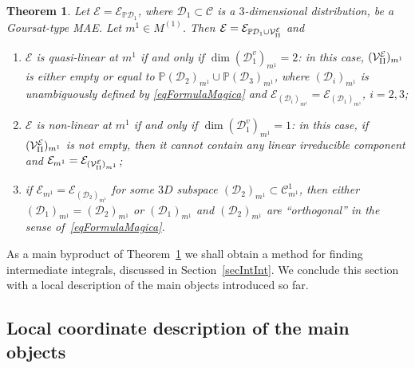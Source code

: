 \documentclass[10pt,a4paper]{amsart}
\newcommand{\C}{\mathcal{C}}
\newcommand{\D}{\mathcal{D}}
\newcommand{\MMM}{\mathcal{V}_{\textrm{\normalfont II}}}
\newcommand{\E}{\mathcal{E}}
\renewcommand{\P}{\mathbb{P}}
\newcommand{\Rd}{^\textrm{rd}}
\numberwithin{equation}{section}
\newtheorem{Theorem}{Theorem}[section]
\begin{document}
\begin{Theorem}%
\label{thFormMag}
 Let $\E=\E_{\P\D_1}$, where $\D_1\subset\C$ is a $3$-dimensional distribution, be a Goursat-type MAE. Let $m^1\in M^{(1)}$. Then $\E=\E_{\P\D_1\cup\MMM^\E}$ and
\begin{enumerate}\itemsep=0pt
 \item[$1)$] $\E$ is quasi-linear at $m^1$ if and only if $\dim(\D_1^v)_{m^1}=2$: in this case, $(\MMM^\E)_{m^1}$ is either empty or equal to $\P({\D_2})_{m^1}\cup\P({\D_3})_{m^1}$, where $({\D_i})_{m^1}$ is unambiguously defined by \eqref{eqFormulaMagica} and $\E_{(\D_i)_{m^1}}=\E_{(\D_1)_{m^1}}$, $i=2,3$;
\item[$2)$] $\E$ is non-linear at $m^1$ if and only if $\dim(\D_1^v)_{m^1}=1$: in this case, if $(\MMM^\E)_{m^1}$ is not empty, then it cannot contain any linear irreducible component and $\E_{m^1}=\E_{(\MMM^\E)_{m^1}}$;
\item[$3)$] if $\E_{m^1}=\E_{(\D_2)_{m^1}}$ for some $3D$ subspace $(\D_2)_{m^1}\subset\C^1_{m^1}$, then either $(\D_1)_{m^1}=(\D_2)_{m^1}$ or $(\D_1)_{m^1}$ and $(\D_2)_{m^1}$ are ``orthogonal'' in the sense of~\eqref{eqFormulaMagica}.
\end{enumerate}
\end{Theorem}

As a main byproduct of Theorem~\ref{thFormMag} we shall obtain a method for f\/inding intermediate integrals, discussed in Section~\ref{secIntInt}.
We conclude this section with a local description of the main objects introduced so far.

\subsection{Local coordinate description of the main objects}
\end{document}
